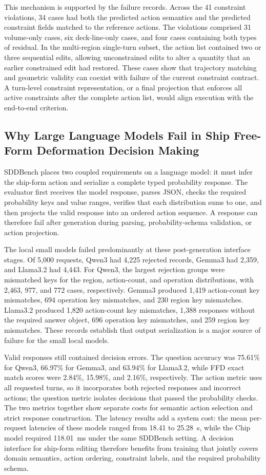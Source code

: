 \documentclass[a4paper,fleqn]{cas-dc}
\begin{document}
This mechanism is supported by the failure records. Across the 41 constraint
violations, 34 cases had both the predicted action semantics and the predicted
constraint fields matched to the reference actions. The violations comprised 31
volume-only cases, six deck-line-only cases, and four cases containing both types
of residual. In the multi-region single-turn subset, the action list contained
two or three sequential edits, allowing unconstrained edits to alter a quantity
that an earlier constrained edit had restored. These cases show that trajectory
matching and geometric validity can coexist with failure of the current
constraint contract. A turn-level constraint representation, or a final
projection that enforces all active constraints after the complete action list,
would align execution with the end-to-end criterion.

\subsection{Why Large Language Models Fail in Ship Free-Form Deformation Decision Making}
\label{sec:llm-failures}
SDDBench places two coupled requirements on a language model: it must infer
the ship-form action and serialize a complete typed probability response. The
evaluator first receives the model response, parses JSON, checks the required
probability keys and value ranges, verifies that each
distribution sums to one, and then projects the valid response into an ordered
action sequence. A response can therefore fail after generation during parsing,
probability-schema validation, or action projection.

The local small models failed predominantly at these post-generation interface
stages. Of 5,000 requests, Qwen3 had 4,225 rejected records, Gemma3 had 2,359,
and Llama3.2 had 4,443. For Qwen3, the largest rejection groups were mismatched
keys for the region, action-count, and operation distributions, with 2,463,
977, and 772 cases, respectively. Gemma3 produced 1,419 action-count key
mismatches, 694 operation key mismatches, and 230 region key mismatches. Llama3.2
produced 1,820 action-count key mismatches, 1,388 responses without the required
answer object, 696 operation key mismatches, and 259 region key mismatches.
These records establish that output serialization is a major source of failure
for the small local models.

Valid responses still contained decision errors. The question accuracy was 75.61\%
for Qwen3, 66.97\% for Gemma3, and 63.94\% for Llama3.2, while FFD exact match scores
were 2.84\%, 15.98\%, and 2.16\%, respectively. The action metric uses all
requested turns, so it incorporates both rejected responses and incorrect
actions; the question metric isolates decisions that passed the probability
checks. The two metrics together show separate costs for semantic action
selection and strict response construction. The latency results add a system
cost: the mean per-request latencies of these models ranged from 18.41 to
25.28~s, while the Chip model required 118.01~ms under the same SDDBench setting. A decision interface for ship-form editing therefore benefits
from training that jointly covers domain semantics, action ordering, constraint
labels, and the required probability schema.
\end{document}
